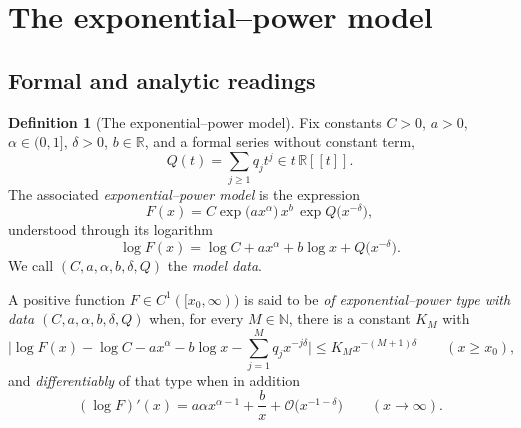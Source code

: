 \documentclass[11pt,a4paper,oneside]{book}
\theoremstyle{plain}
\theoremstyle{definition}
\newtheorem{definition}[theorem]{Definition}
\theoremstyle{remark}
\newcommand{\Nat}{\mathbb{N}}
\newcommand{\Real}{\mathbb{R}}
\newcommand{\bigO}{\mathcal{O}}
\begin{document}
\section{The exponential--power model}\label{p0:sec:model}

\subsection{Formal and analytic readings}

\begin{definition}[The exponential--power model]\label{p0:def:model}
Fix constants $C>0$, $a>0$, $\alpha\in(0,1]$, $\delta>0$, $b\in\Real$, and a
formal series without constant term,
\[
 Q(t)=\sum_{j\ge1}q_jt^j\in t\,\Real[[t]] .
\]
The associated \emph{exponential--power model} is the expression
\begin{equation}\label{p0:eq:model}
 F(x)=C\exp\bigl(ax^\alpha\bigr)\,x^{b}\,\exp Q\bigl(x^{-\delta}\bigr),
\end{equation}
understood through its logarithm
\begin{equation}\label{p0:eq:model-log}
 \log F(x)=\log C+ax^{\alpha}+b\log x+Q\bigl(x^{-\delta}\bigr).
\end{equation}
We call $(C,a,\alpha,b,\delta,Q)$ the \emph{model data}.

A positive function $F\in C^1([x_0,\infty))$ is said to be \emph{of
exponential--power type with data $(C,a,\alpha,b,\delta,Q)$} when, for every
$M\in\Nat$, there is a constant $K_M$ with
\begin{equation}\label{p0:eq:model-analytic}
 \Biggl|\log F(x)-\log C-ax^{\alpha}-b\log x
        -\sum_{j=1}^{M}q_jx^{-j\delta}\Biggr|
 \le K_Mx^{-(M+1)\delta}
 \qquad(x\ge x_0),
\end{equation}
and \emph{differentiably} of that type when in addition
\begin{equation}\label{p0:eq:model-derivative}
 (\log F)'(x)=a\alpha x^{\alpha-1}+\frac bx+\bigO\bigl(x^{-1-\delta}\bigr)
 \qquad(x\to\infty).
\end{equation}
\end{definition}
\end{document}
